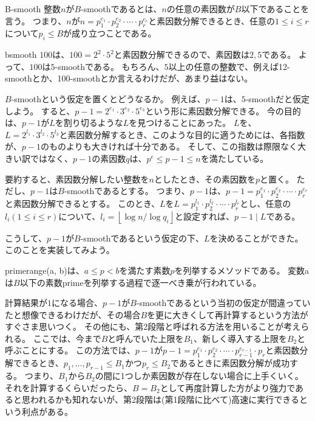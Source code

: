 \begin{Defi}{}{B-smooth}
整数$n$が$B$-smoothであるとは、$n$の任意の素因数が$B$以下であることを言う。
つまり、$n$が$n=p_1^{e_1}\cdot p_2^{e_2}\cdot\cdots\cdot p_r^{e_r}$と素因数分解できるとき、任意の$1\le i\le r$について$p_i \le B$が成り立つことである。
\end{Defi}

\begin{Exam}{}{bsmooth}
$100$は、$100=2^2\cdot5^2$と素因数分解できるので、素因数は$2,5$である。
よって、$100$は$5$-smoothである。
もちろん、$5$以上の任意の整数で、例えば12-smoothとか、100-smoothとか言えるわけだが、あまり益はない。
\end{Exam}

$B$-smoothという仮定を置くとどうなるか。
例えば、$p-1$は、$5$-smoothだと仮定しよう。
すると、$p-1=2^{e_1}\cdot3^{e_2}\cdot5^{e_3}$という形に素因数分解できる。
今の目的は、$p-1$が$L$を割り切るような$L$を見つけることにあった。
$L$を、$L=2^{l_1}\cdot3^{l_2}\cdot5^{l_3}$と素因数分解するとき、このような目的に適うためには、各指数が、$p-1$のものよりも大きければ十分である。
そして、この指数は際限なく大きい訳ではなく、$p-1$の素因数$q$は、$p^e\le p-1\le n$を満たしている。

要約すると、素因数分解したい整数を$n$としたとき、その素因数を$p$と置く。
ただし、$p-1$は$B$-smoothであるとする。
つまり、$p-1$は、$p-1=p_1^{e_1}\cdot p_2^{e_2}\cdot\cdots\cdot p_r^{e_r}$と素因数分解できるとする。
このとき、$L$を$L=p_1^{l_1}\cdot p_2^{l_2}\cdot\cdots\cdot p_r^{l_r}$とし、任意の$l_i(1\le i\le r)$について、$l_i =\left \lfloor \log{n} / \log{q_i}\right \rfloor$と設定すれば、$p-1 \mid L$である。

こうして、$p-1$が$B$-smoothであるという仮定の下、$L$を決めることができた。
このことを実装してみよう。


primerange(a, b)は、$a \le p < b$を満たす素数$p$を列挙するメソッドである。
変数aは$B$以下の素数primeを列挙する過程で逐一べき乗が行われている。

計算結果が$1$になる場合、$p-1$が$B$-smoothであるという当初の仮定が間違っていたと想像できるわけだが、その場合$B$を更に大きくして再計算するという方法がすぐさま思いつく。
その他にも、第2段階と呼ばれる方法を用いることが考えられる。
ここでは、今まで$B$と呼んでいた上限を$B_1$、新しく導入する上限を$B_2$と呼ぶことにする。
この方法では、$p-1$が$p-1=p_1^{e_1}\cdot p_2^{e_2}\cdot\cdots\cdot p_{r-1}^{e_{r-1}}\cdot p_r$と素因数分解できるとき、$p_1,\ldots,p_{r-1}\le B_1$かつ$p_r\le B_2$であるときに素因数分解が成功する。
つまり、$B_1$から$B_2$の間に1つしか素因数が存在しない場合に上手くいく。
それを計算するくらいだったら、$B=B_2$として再度計算した方がより強力であると思われるかも知れないが、第2段階は(第1段階に比べて)高速に実行できるという利点がある。

